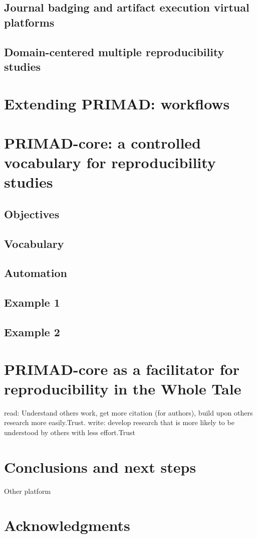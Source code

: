 \documentclass{article}
\begin{document}
\subsection{Journal badging and artifact execution virtual platforms}

\subsection{Domain-centered multiple reproducibility studies}

\section{Extending PRIMAD: workflows}

\section{PRIMAD-core: a controlled vocabulary for reproducibility studies}

\subsection{Objectives}

\subsection{Vocabulary}

\subsection{Automation}

\subsection{Example 1}

\subsection{Example 2}

\section{PRIMAD-core as a facilitator for reproducibility in the Whole Tale}
read: Understand others work, get more citation (for authors), build upon others research more easily.Trust.
write: develop research that is more likely to be understood by others with less effort.Trust

\section{Conclusions and next steps}
Other platform 

\section{Acknowledgments}



\end{document}
